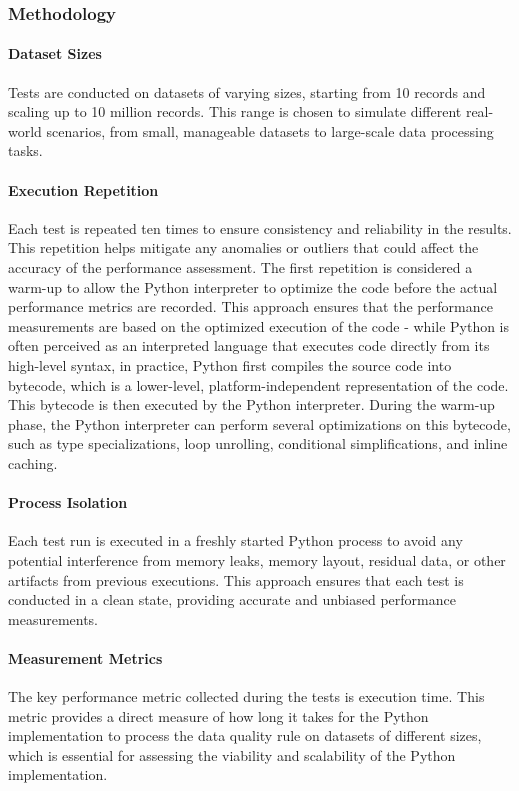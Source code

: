\subsubsection{Methodology}

\paragraph{Dataset Sizes} Tests are conducted on datasets of varying sizes, starting from 10 records and scaling up to 10 million records. This range is chosen to simulate different real-world scenarios, from small, manageable datasets to large-scale data processing tasks.

\paragraph{Execution Repetition} Each test is repeated ten times to ensure consistency and reliability in the results. This repetition helps mitigate any anomalies or outliers that could affect the accuracy of the performance assessment.
The first repetition is considered a warm-up to allow the Python interpreter to optimize the code before the actual performance metrics are recorded. This approach ensures that the performance measurements are based on the optimized execution of the code - while Python is often perceived as an interpreted language that executes code directly from its high-level syntax, in practice, Python first compiles the source code into bytecode, which is a lower-level, platform-independent representation of the code. This bytecode is then executed by the Python interpreter. During the warm-up phase, the Python interpreter can perform several optimizations on this bytecode, such as type specializations, loop unrolling, conditional simplifications, and inline caching. 

\paragraph{Process Isolation} Each test run is executed in a freshly started Python process to avoid any potential interference from memory leaks, memory layout, residual data, or other artifacts from previous executions. This approach ensures that each test is conducted in a clean state, providing accurate and unbiased performance measurements.

\paragraph{Measurement Metrics} The key performance metric collected during the tests is execution time. This metric provides a direct measure of how long it takes for the Python implementation to process the data quality rule on datasets of different sizes, which is essential for assessing the viability and scalability of the Python implementation.



